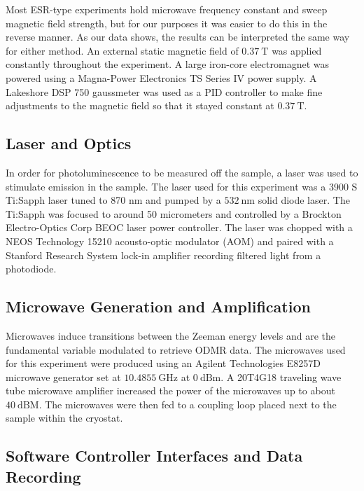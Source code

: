 \documentclass[oneside, noacknowlegments]{BYUPhys}
\begin{document}
Most ESR-type experiments hold microwave frequency constant and sweep magnetic field strength, but for our purposes it was easier to do this in the reverse manner. As our data shows, the results can be interpreted the same way for either method. An external static magnetic field of $0.37~\text{T}$ was applied constantly throughout the experiment. A large iron-core electromagnet was powered using a Magna-Power Electronics TS Series IV power supply. A Lakeshore DSP 750 gaussmeter was used as a PID controller to make fine adjustments to the magnetic field so that it stayed constant at $0.37~\text{T}$.

\subsection{Laser and Optics}

In order for photoluminescence to be measured off the sample, a laser was used to stimulate emission in the sample. The laser used for this experiment was a 3900 S Ti:Sapph laser tuned to 870 nm and pumped by a $532~\text{nm}$ solid diode laser. The Ti:Sapph was focused to around 50 micrometers and controlled by a Brockton Electro-Optics Corp BEOC laser power controller. The laser was chopped with a NEOS Technology 15210 acousto-optic modulator (AOM) and paired with a Stanford Research System lock-in amplifier recording filtered light from a photodiode.

\subsection{Microwave Generation and Amplification}

Microwaves induce transitions between the Zeeman energy levels and are the fundamental variable modulated to retrieve ODMR data. The microwaves used for this experiment were produced using an Agilent Technologies E8257D microwave generator set at $10.4855~\text{GHz}$ at $0~\text{dBm}$. A 20T4G18 traveling wave tube microwave amplifier increased the power of the microwaves up to about $40~\text{dBM}$. The microwaves were then fed to a coupling loop placed next to the sample within the cryostat.

\subsection{Software Controller Interfaces and Data Recording}
\end{document}

